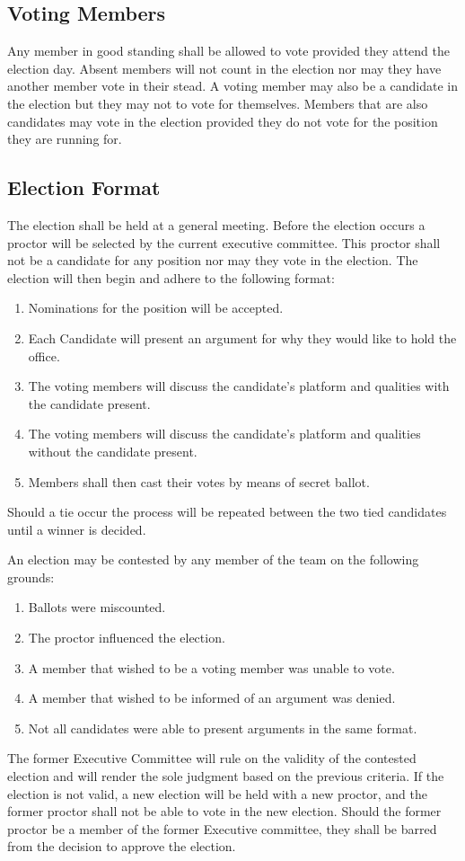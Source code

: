 \documentclass[12pt,titlepage,letter]{article}
\begin{document}
\subsection{Voting Members}
Any member in good standing shall be allowed to vote provided they attend the election day. Absent members will not count in the election nor may they have another member vote in their stead. A voting member may also be a candidate in the election but they may not to vote for themselves. Members that are also candidates may vote in the election provided they do not vote for the position they are running for.

\subsection{Election Format}
The election shall be held at a general meeting. Before the election occurs a proctor will be selected by the current executive committee. This proctor shall not be a candidate for any position nor may they vote in the election. The election will then begin and adhere to the following format:

\begin{enumerate}
\item
	Nominations for the position will be accepted.
\item
	Each Candidate will present an argument for why they would like to hold the office.
\item
	The voting members will discuss the candidate's platform and qualities with the candidate present.
\item
	The voting members will discuss the candidate's platform and qualities without the candidate present.
\item
	Members shall then cast their votes by means of secret ballot.
\end{enumerate}
Should a tie occur the process will be repeated between the two tied candidates until a winner is decided.

An election may be contested by any member of the team on the following grounds:
\begin{enumerate}
\item
Ballots were miscounted.
\item
The proctor influenced the election.
\item
A member that wished to be a voting member was unable to vote.
\item
A member that wished to be informed of an argument was denied.
\item
Not all candidates were able to present arguments in the same format.
\end{enumerate}
The former Executive Committee will rule on the validity of the contested election and will render the sole judgment based on the previous criteria. If the election is not valid, a new election will be held with a new proctor, and the former proctor shall not be able to vote in the new election. Should the former proctor be a member of the former Executive committee, they shall be barred from the decision to approve the election.
\end{document}
